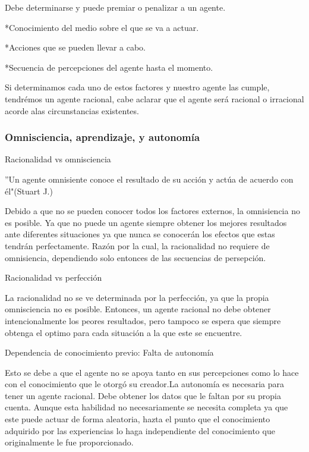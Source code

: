 \documentclass{article}
\begin{document}
Debe determinarse y puede premiar o penalizar a un agente.
    
*Conocimiento del medio sobre el que se va a actuar.

*Acciones que se pueden llevar a cabo.

*Secuencia de percepciones del agente hasta el momento.

Si determinamos cada uno de estos factores y nuestro agente las cumple, tendrémos un agente racional, cabe aclarar que el agente será racional o irracional acorde alas circunstancias existentes.


\subsubsection{Omnisciencia, aprendizaje, y autonomía}

\vspace{5mm}
Racionalidad vs omnisciencia

\vspace{5mm}
    ''Un agente omnisiente conoce el resultado de su acción y actúa de acuerdo con él"(Stuart J.)
    
    Debido a que no se pueden conocer todos los factores externos, la omnisiencia no es posible. Ya que no puede un agente siempre obtener los mejores resultados ante diferentes situaciones ya que nunca se conocerán los efectos que estas tendrán perfectamente. Razón por la cual, la racionalidad no requiere de omnisiencia, dependiendo solo entonces de las secuencias de persepción.
    
\vspace{5mm}

Racionalidad vs perfección
\vspace{5mm}

    La racionalidad no se ve determinada por la perfección, ya que la propia omnisciencia no es posible. Entonces, un agente racional no debe obtener intencionalmente los peores resultados, pero tampoco se espera que siempre obtenga el optimo para cada situación a la que este se encuentre. 
    
\vspace{5mm}

Dependencia de conocimiento previo: Falta de autonomía
\vspace{5mm}

Esto se debe a que el agente no se apoya tanto en sus percepciones como lo hace con el conocimiento que le otorgó su creador.La autonomía es necesaria para tener un agente racional. Debe obtener los datos que le faltan por su propia cuenta. Aunque esta habilidad no necesariamente se necesita completa ya que este puede actuar de forma aleatoria, hazta el punto que el conocimiento adquirido por las experiencias lo haga independiente del conocimiento que originalmente le fue proporcionado.
\end{document}

